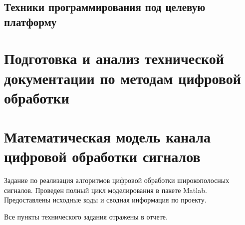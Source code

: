 \documentclass[utf8,usehyperref,12pt]{G7-32}
\begin{document}
\section{Техники программирования под целевую платформу}

\chapter{Подготовка и анализ технической документации по методам цифровой обработки}

\chapter{Математическая модель канала цифровой обработки сигналов}


\Conclusion %
Задание по реализация алгоритмов цифровой обработки широкополосных сигналов. Проведен полный цикл моделирования в пакете Matlab. Предоставлены исходные коды и сводная информация по проекту.

Все пункты технического задания отражены в отчете.
\end{document}

